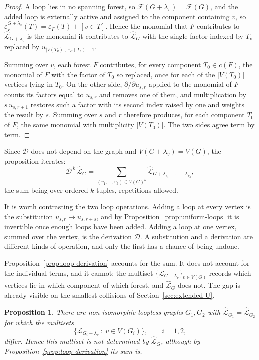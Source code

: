 \documentclass[11pt]{article}
\theoremstyle{plain}
\newtheorem{proposition}[theorem]{Proposition}
\theoremstyle{definition}
\renewcommand{\mathcal}{\mathscr}
\newcommand{\LL}{\mathcal{L}}    %
\newcommand{\cF}{\mathcal{F}}    %
\newcommand{\cD}{\mathcal{D}}
\newcommand{\eps}{\varepsilon}
\numberwithin{equation}{section}
\begin{document}
\begin{proof}
A loop lies in no spanning forest, so $\cF(G+\lambda_v)=\cF(G)$, and the
added loop is externally active and assigned to the component containing
$v$, so $\eps^{G+\lambda_v}_F(T)=\eps_F(T)+[v\in T]$.  Hence
the monomial that $F$ contributes to $\widehat{\LL}_{G+\lambda_v}$ is the
monomial it contributes to $\widehat{\LL}_G$ with the single factor indexed
by $T_v$ replaced by $u_{|V(T_v)|,\,\eps_F(T_v)+1}$.

Summing over $v$, each forest $F$ contributes, for every component
$T_0\in c(F)$, the monomial of $F$ with the factor of $T_0$ so replaced,
once for each of the $|V(T_0)|$ vertices lying in $T_0$.  On the other side,
$\partial/\partial u_{s,r}$ applied to the monomial of $F$ counts its
factors equal to $u_{s,r}$ and removes one of them, and multiplication by
$s\,u_{s,r+1}$ restores such a factor with its second index raised by one
and weights the result by $s$.  Summing over $s$ and $r$ therefore produces,
for each component $T_0$ of $F$, the same monomial with multiplicity
$|V(T_0)|$.  The two sides agree term by term.
\end{proof}

Since $\cD$ does not depend on the graph and
$V(G+\lambda_v)=V(G)$, the proposition iterates:
\begin{equation}\label{eq:loop-derivation-iterated}
   \cD^{\,k}\,\widehat{\LL}_G
   =
   \sum_{(v_1,\dots,v_k)\in V(G)^k}
      \widehat{\LL}_{G+\lambda_{v_1}+\cdots+\lambda_{v_k}} ,
\end{equation}
the sum being over ordered $k$-tuples, repetitions allowed.

It is worth contrasting the two loop operations.  Adding a loop at every
vertex is the substitution $u_{s,r}\mapsto u_{s,r+s}$, and by
Proposition~\ref{prop:uniform-loops} it is invertible once enough loops have
been added.  Adding a loop at one vertex, summed over the vertex, is the
derivation $\cD$.  A substitution and a derivation are different
kinds of operation, and only the first has a chance of being undone.

Proposition~\ref{prop:loop-derivation} accounts for the sum.  It does not
account for the individual terms, and it cannot: the multiset
$\{\LL_{G+\lambda_v}\}_{v\in V(G)}$ records which vertices lie in which
component of which forest, and $\widehat{\LL}_G$ does not.  The gap is
already visible on the smallest collisions of
Section~\ref{sec:extended-U}.

\begin{proposition}\label{prop:single-loop-exceeds}
There are non-isomorphic loopless graphs $G_1,G_2$ with
$\widehat{\LL}_{G_1}=\widehat{\LL}_{G_2}$ for which the multisets
\[
   \bigl\{\LL_{G_i+\lambda_v}\ :\ v\in V(G_i)\bigr\},
   \qquad i=1,2,
\]
differ.  Hence this multiset is not determined by $\widehat{\LL}_G$,
although by Proposition~\ref{prop:loop-derivation} its sum is.
\end{proposition}
\end{document}
